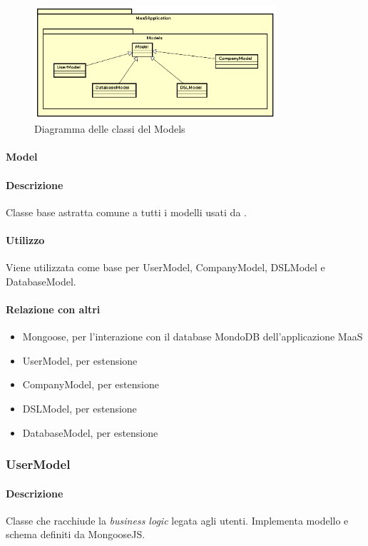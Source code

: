 \begin{figure}[H]
\centering
\includegraphics[width=0.8\textwidth]{res/sections/backend/models.png}
\caption{Diagramma delle classi del  Models}
\end{figure}

\paragraph{Model}
\paragraph*{Descrizione}
Classe base astratta comune a tutti i modelli usati da .

\paragraph*{Utilizzo}
Viene utilizzata come base per UserModel, CompanyModel, DSLModel e DatabaseModel.

\paragraph*{Relazione con altri }
\begin{itemize}
\item Mongoose, per l'interazione con il database MondoDB dell'applicazione MaaS
\item UserModel, per estensione
\item CompanyModel, per estensione
\item DSLModel, per estensione
\item DatabaseModel, per estensione
\end{itemize}

\subsubsection{UserModel}
\paragraph*{Descrizione}
Classe che racchiude la \textit{business logic} legata agli utenti. Implementa modello e schema definiti da MongooseJS.


